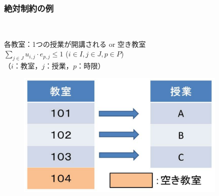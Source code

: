 \documentclass[dvipdfmx,12pt]{beamer}
\begin{document}
\begin{frame}
 \frametitle{\LARGE 絶対制約の例}

\\
\begin{center}
{\Large 各教室：1つの授業が開講される or 空き教室}\\
\vspace{2.0mm}
{\Large $\displaystyle \sum_{j \in J}u_{i,j} \cdot e_{p,j} \leq 1$}
\hspace{1.0mm}
{\Large($i \in I,j \in J,p \in P$)}\\
\vspace{-2.0mm}
{\Large（$i$：教室，$j$：授業，$p$：時限）}
\end{center}
\vspace{-4.0mm}
\begin{figure}[htbp]
 \begin{center}
  \includegraphics[width=100mm]{soturon_pre5.eps}
 \end{center}
\end{figure}


\end{frame}
\end{document}
